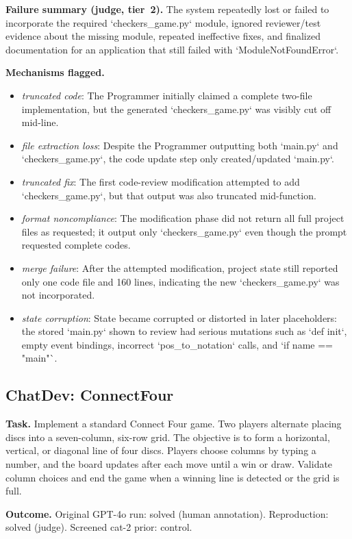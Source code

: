 \textbf{Failure summary (judge, tier~2).} The system repeatedly lost or failed to incorporate the required `checkers\_game.py` module, ignored reviewer/test evidence about the missing module, repeated ineffective fixes, and finalized documentation for an application that still failed with `ModuleNotFoundError`.

\textbf{Mechanisms flagged.}
\begin{itemize}
  \item \emph{truncated code}: The Programmer initially claimed a complete two-file implementation, but the generated `checkers\_game.py` was visibly cut off mid-line.
  \item \emph{file extraction loss}: Despite the Programmer outputting both `main.py` and `checkers\_game.py`, the code update step only created/updated `main.py`.
  \item \emph{truncated fix}: The first code-review modification attempted to add `checkers\_game.py`, but that output was also truncated mid-function.
  \item \emph{format noncompliance}: The modification phase did not return all full project files as requested; it output only `checkers\_game.py` even though the prompt requested complete codes.
  \item \emph{merge failure}: After the attempted modification, project state still reported only one code file and 160 lines, indicating the new `checkers\_game.py` was not incorporated.
  \item \emph{state corruption}: State became corrupted or distorted in later placeholders: the stored `main.py` shown to review had serious mutations such as `def init`, empty event bindings, incorrect `pos\_to\_notation` calls, and `if name == "main"`.
\end{itemize}

\subsection*{ChatDev: ConnectFour}
\textbf{Task.} Implement a standard Connect Four game. Two players alternate placing discs into a seven-column, six-row grid. The objective is to form a horizontal, vertical, or diagonal line of four discs. Players choose columns by typing a number, and the board updates after each move until a win or draw. Validate column choices and end the game when a winning line is detected or the grid is full.

\textbf{Outcome.} Original GPT-4o run: solved (human annotation). Reproduction: solved (judge). Screened cat-2 prior: control.

